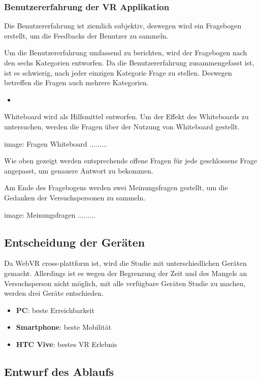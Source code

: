 \subsubsection{Benutzererfahrung der VR Applikation}

Die Benutzererfahrung ist ziemlich subjektiv, deswegen wird ein Fragebogen erstellt, um die Feedbacks der Benutzer zu sammeln.

Um die Benutzererfahrung umfassend zu berichten, wird der Fragebogen nach den sechs Kategorien \citep{28} entworfen. Da die Benutzererfahrung zusammengefasst ist, ist es schwierig, nach jeder einzigen Kategorie Frage zu stellen. Deswegen betreffen die Fragen auch mehrere Kategorien.

\begin{itemize}
    \item 
\end{itemize}

Whiteboard wird als Hilfsmittel entworfen. Um der Effekt des Whiteboards zu untersuchen, werden die Fragen über der Nutzung von Whiteboard gestellt.

image: Fragen Whiteboard .........

Wie oben gezeigt werden entsprechende offene Fragen für jede geschlossene Frage angepasst, um genauere Antwort zu bekommen.

Am Ende des Fragebogens werden zwei Meinungsfragen gestellt, um die Gedanken der Versuchspersonen zu sammeln.

image: Meinungsfragen .........

\subsection{Entscheidung der Geräten}

Da WebVR cross-plattform ist, wird die Studie mit unterschiedlichen Geräten gemacht. Allerdings ist es wegen der Begrenzung der Zeit und des Mangels an Versuchsperson nicht möglich, mit alle verfügbare Geräten Studie zu machen, werden drei Geräte entschieden.

\begin{itemize}
    \item \textbf{PC}: beste Erreichbarkeit
    \item \textbf{Smartphone}: beste Mobilität
    \item \textbf{HTC Vive}: bestes VR Erlebnis
\end{itemize}

\subsection{Entwurf des Ablaufs}

